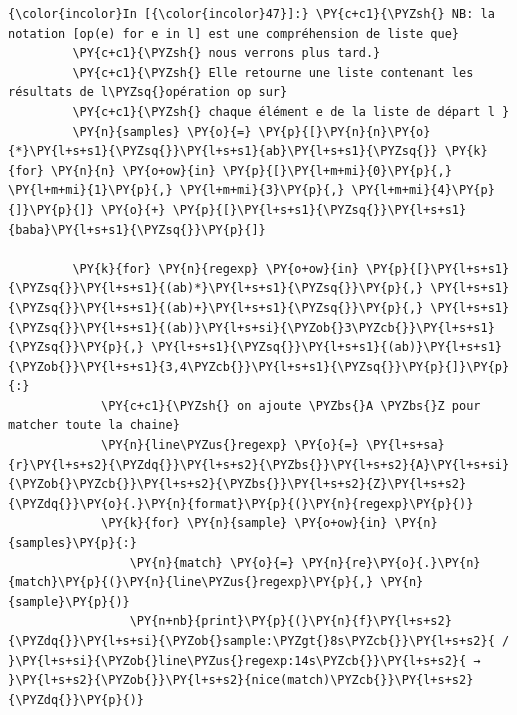    \begin{Verbatim}[commandchars=\\\{\}]
{\color{incolor}In [{\color{incolor}47}]:} \PY{c+c1}{\PYZsh{} NB: la notation [op(e) for e in l] est une compréhension de liste que}
         \PY{c+c1}{\PYZsh{} nous verrons plus tard.}
         \PY{c+c1}{\PYZsh{} Elle retourne une liste contenant les résultats de l\PYZsq{}opération op sur}
         \PY{c+c1}{\PYZsh{} chaque élément e de la liste de départ l }
         \PY{n}{samples} \PY{o}{=} \PY{p}{[}\PY{n}{n}\PY{o}{*}\PY{l+s+s1}{\PYZsq{}}\PY{l+s+s1}{ab}\PY{l+s+s1}{\PYZsq{}} \PY{k}{for} \PY{n}{n} \PY{o+ow}{in} \PY{p}{[}\PY{l+m+mi}{0}\PY{p}{,} \PY{l+m+mi}{1}\PY{p}{,} \PY{l+m+mi}{3}\PY{p}{,} \PY{l+m+mi}{4}\PY{p}{]}\PY{p}{]} \PY{o}{+} \PY{p}{[}\PY{l+s+s1}{\PYZsq{}}\PY{l+s+s1}{baba}\PY{l+s+s1}{\PYZsq{}}\PY{p}{]}
         
         \PY{k}{for} \PY{n}{regexp} \PY{o+ow}{in} \PY{p}{[}\PY{l+s+s1}{\PYZsq{}}\PY{l+s+s1}{(ab)*}\PY{l+s+s1}{\PYZsq{}}\PY{p}{,} \PY{l+s+s1}{\PYZsq{}}\PY{l+s+s1}{(ab)+}\PY{l+s+s1}{\PYZsq{}}\PY{p}{,} \PY{l+s+s1}{\PYZsq{}}\PY{l+s+s1}{(ab)}\PY{l+s+si}{\PYZob{}3\PYZcb{}}\PY{l+s+s1}{\PYZsq{}}\PY{p}{,} \PY{l+s+s1}{\PYZsq{}}\PY{l+s+s1}{(ab)}\PY{l+s+s1}{\PYZob{}}\PY{l+s+s1}{3,4\PYZcb{}}\PY{l+s+s1}{\PYZsq{}}\PY{p}{]}\PY{p}{:}
             \PY{c+c1}{\PYZsh{} on ajoute \PYZbs{}A \PYZbs{}Z pour matcher toute la chaine}
             \PY{n}{line\PYZus{}regexp} \PY{o}{=} \PY{l+s+sa}{r}\PY{l+s+s2}{\PYZdq{}}\PY{l+s+s2}{\PYZbs{}}\PY{l+s+s2}{A}\PY{l+s+si}{\PYZob{}\PYZcb{}}\PY{l+s+s2}{\PYZbs{}}\PY{l+s+s2}{Z}\PY{l+s+s2}{\PYZdq{}}\PY{o}{.}\PY{n}{format}\PY{p}{(}\PY{n}{regexp}\PY{p}{)}
             \PY{k}{for} \PY{n}{sample} \PY{o+ow}{in} \PY{n}{samples}\PY{p}{:}
                 \PY{n}{match} \PY{o}{=} \PY{n}{re}\PY{o}{.}\PY{n}{match}\PY{p}{(}\PY{n}{line\PYZus{}regexp}\PY{p}{,} \PY{n}{sample}\PY{p}{)}
                 \PY{n+nb}{print}\PY{p}{(}\PY{n}{f}\PY{l+s+s2}{\PYZdq{}}\PY{l+s+si}{\PYZob{}sample:\PYZgt{}8s\PYZcb{}}\PY{l+s+s2}{ / }\PY{l+s+si}{\PYZob{}line\PYZus{}regexp:14s\PYZcb{}}\PY{l+s+s2}{ → }\PY{l+s+s2}{\PYZob{}}\PY{l+s+s2}{nice(match)\PYZcb{}}\PY{l+s+s2}{\PYZdq{}}\PY{p}{)}
\end{Verbatim}


